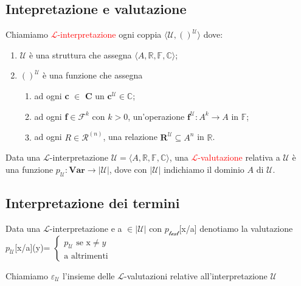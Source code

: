 \documentclass[a4paper, 12pt]{book}
\begin{document}
\subsection*{Intepretazione e valutazione}
Chiamiamo \textcolor{red}{$\mathcal{L}$\nobreakdash-interpretazione} ogni coppia $\langle \mathcal{U}, ()^{\mathcal{U}} \rangle$ dove:
\begin{enumerate}
  \item $\mathcal{U}$ è una struttura che assegna $\langle A, \mathbb{R}, \mathbb{F}, \mathbb{C} \rangle$;
\item $()^{\mathcal{U}}$ è una funzione che assegna
  \begin{enumerate}
    \item ad ogni \textbf{c} $\in$ $\mathcal{\textbf{C}}$ un $\textbf{c}^{\mathcal{U}} \in \mathbb{C}$;
    \item ad ogni \textbf{f}$ \in \mathcal{F}^k$ con $k > 0$, un'operazione $\textbf{f}^{\mathcal{U}} : A^k \rightarrow A$ in $\mathbb{F}$;
    \item ad ogni $R \in \mathcal{R}^{(n)}$, una relazione $\textbf{R}^{\mathcal{U}} \subseteq A^n$ in $\mathbb{R}$.
  \end{enumerate}
\end{enumerate}

\vspace{2em}
Data una $\mathcal{L}$\nobreakdash-interpretazione 
$\mathcal{U} = \langle A, \mathbb{R}, \mathbb{F}, \mathbb{C} \rangle$, 
una \textcolor{red}{$\mathcal{L}$-valutazione} relativa a $\mathcal{U}$ 
è una funzione 
$p_{\mathcal{U}} : \textbf{Var} \rightarrow |\mathcal{U}|$, 
dove con $|\mathcal{U}|$ indichiamo il dominio $A$ di $\mathcal{U}$.


\subsection*{Interpretazione dei termini}
Data una $\mathcal{L}$-interpretazione e a $\in |\mathcal{U}|$ con $p_{\mathcal{text}}$[x/a] denotiamo la valutazione\\
$p_{\mathcal{U}}$[x/a](y)= 
\(
\begin{cases}
p_\mathcal{U}\text{ se x} \neq y\\
\text{a altrimenti}
\end{cases}
\)


Chiamiamo $\varepsilon_{\mathcal{U}}$ l'insieme delle $\mathcal{L}$-valutazioni relative all'interpretazione $\mathcal{U}$ 
\end{document}
